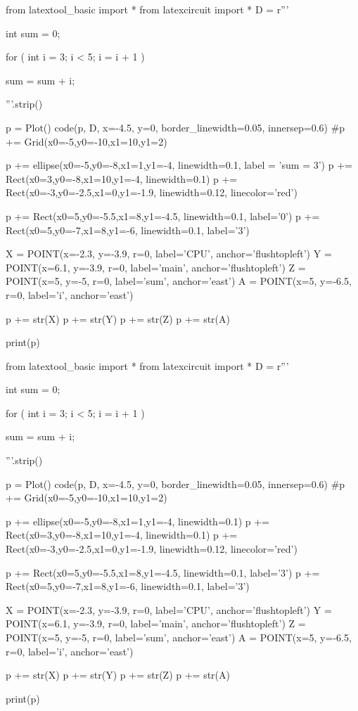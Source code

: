 \begin{python}
from latextool_basic import *
from latexcircuit import *
D = r'''



int sum = 0;

    for ( int i = 3;     i < 5;     i = i + 1 )


        sum = sum + i;



'''.strip()

p = Plot()
code(p, D, x=-4.5, y=0, border_linewidth=0.05, innersep=0.6)
#p += Grid(x0=-5,y0=-10,x1=10,y1=2)

p += ellipse(x0=-5,y0=-8,x1=1,y1=-4, linewidth=0.1, label = 'sum = 3')
p += Rect(x0=3,y0=-8,x1=10,y1=-4, linewidth=0.1)
p += Rect(x0=-3,y0=-2.5,x1=0,y1=-1.9, linewidth=0.12, linecolor='red')

p += Rect(x0=5,y0=-5.5,x1=8,y1=-4.5, linewidth=0.1, label='0')
p += Rect(x0=5,y0=-7,x1=8,y1=-6, linewidth=0.1, label='3')

X = POINT(x=-2.3, y=-3.9, r=0, label='CPU', anchor='flushtopleft')
Y = POINT(x=6.1, y=-3.9, r=0, label='main', anchor='flushtopleft')
Z = POINT(x=5, y=-5, r=0, label='sum', anchor='east')
A = POINT(x=5, y=-6.5, r=0, label='i', anchor='east')

p += str(X)
p += str(Y)
p += str(Z)
p += str(A)

print(p)
\end{python}

\begin{python}
from latextool_basic import *
from latexcircuit import *
D = r'''



int sum = 0;

    for ( int i = 3;     i < 5;     i = i + 1 )


        sum = sum + i;



'''.strip()

p = Plot()
code(p, D, x=-4.5, y=0, border_linewidth=0.05, innersep=0.6)
#p += Grid(x0=-5,y0=-10,x1=10,y1=2)

p += ellipse(x0=-5,y0=-8,x1=1,y1=-4, linewidth=0.1)
p += Rect(x0=3,y0=-8,x1=10,y1=-4, linewidth=0.1)
p += Rect(x0=-3,y0=-2.5,x1=0,y1=-1.9, linewidth=0.12, linecolor='red')

p += Rect(x0=5,y0=-5.5,x1=8,y1=-4.5, linewidth=0.1, label='3')
p += Rect(x0=5,y0=-7,x1=8,y1=-6, linewidth=0.1, label='3')

X = POINT(x=-2.3, y=-3.9, r=0, label='CPU', anchor='flushtopleft')
Y = POINT(x=6.1, y=-3.9, r=0, label='main', anchor='flushtopleft')
Z = POINT(x=5, y=-5, r=0, label='sum', anchor='east')
A = POINT(x=5, y=-6.5, r=0, label='i', anchor='east')

p += str(X)
p += str(Y)
p += str(Z)
p += str(A)

print(p)
\end{python}


